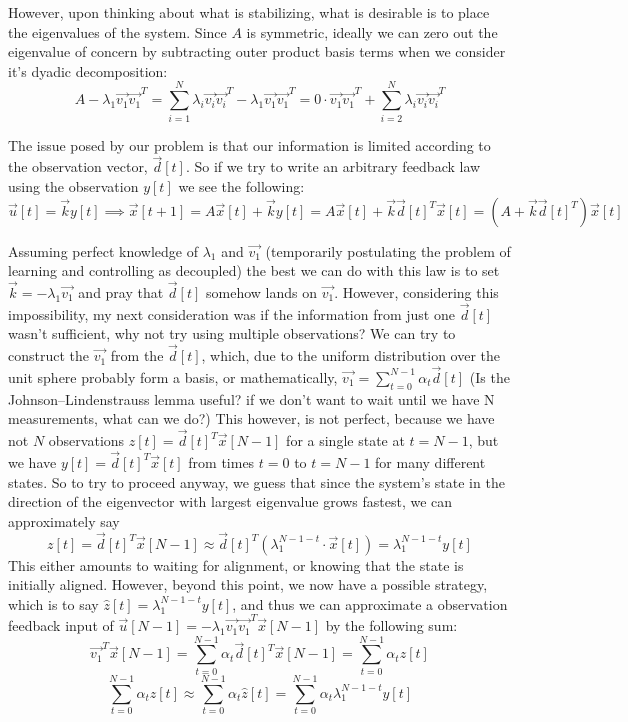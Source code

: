 \documentclass[letterpaper]{article}
\theoremstyle{remark}
\begin{document}
However, upon thinking about what is stabilizing, what is desirable is to place the eigenvalues of the system. Since $A$ is symmetric, ideally we can zero out the eigenvalue of concern by subtracting outer product basis terms when we consider it's dyadic decomposition:
$$A - \lambda_1\vec{v_1}\vec{v_1}^T = \sum_{i=1}^N\lambda_i\vec{v_i}\vec{v_i}^T -\lambda_1\vec{v_1}\vec{v_1}^T = 0\cdot\vec{v_1}\vec{v_1}^T +  \sum_{i=2}^N\lambda_i\vec{v_i}\vec{v_i}^T$$

The issue posed by our problem is that our information is limited according to the observation vector, $\vec{d}[t]$. So if we try to write an arbitrary feedback law using the observation $y[t]$ we see the following:
$$\vec{u}[t] = \vec{k}y[t] \implies \vec{x}[t+1] = A\vec{x}[t] + \vec{k}y[t] = A\vec{x}[t] + \vec{k}\vec{d}[t]^T\vec{x}[t] = \left(A + \vec{k}\vec{d}[t]^T\right)\vec{x}[t]$$

Assuming perfect knowledge of $\lambda_1$ and $\vec{v_1}$ (temporarily postulating the problem of learning and controlling as decoupled) the best we can do with this law is to set $\vec{k} = -\lambda_1\vec{v_1}$ and pray that $\vec{d}[t]$ somehow lands on $\vec{v_1}$. However, considering this impossibility, my next consideration was if the information from just one $\vec{d}[t]$ wasn't sufficient, why not try using multiple observations? We can try to construct the $\vec{v_1}$ from the $\vec{d}[t]$, which, due to the uniform distribution over the unit sphere probably form a basis, or mathematically, $\vec{v_1} = \sum_{t=0}^{N-1}\alpha_t\vec{d}[t]$ (Is the Johnson–Lindenstrauss lemma useful? if we don't want to wait until we have N measurements, what can we do?) This however, is not perfect, because we have not $N$ observations $z[t] =\vec{d}[t]^T\vec{x}[N-1]$ for a single state at $t = N-1$, but we have $y[t] = \vec{d}[t]^T\vec{x}[t]$ from times $t = 0$ to $t = N-1$ for many different states. So to try to proceed anyway, we guess that since the system's state in the direction of the eigenvector with largest eigenvalue grows fastest, we can approximately say
$$z[t] = \vec{d}[t]^T\vec{x}[N-1] \approx \vec{d}[t]^T(\lambda_1^{N-1-t}\cdot\vec{x}[t]) = \lambda_1^{N-1-t}y[t]$$
This either amounts to waiting for alignment, or knowing that the state is initially aligned. However, beyond this point, we now have a possible strategy, which is to say $\hat{z}[t] = \lambda_1^{N-1 - t}y[t]$, and thus we can approximate a observation feedback input of $\vec{u}[N-1] =-\lambda_1\vec{v_1}\vec{v_1}^T\vec{x}[N-1]$ by the following sum:
$$\vec{v_1}^T\vec{x}[N-1] = \sum_{t=0}^{N-1}\alpha_t\vec{d}[t]^T\vec{x}[N-1] = \sum_{t=0}^{N-1}\alpha_tz[t]$$
$$\sum_{t=0}^{N-1}\alpha_tz[t] \approx \sum_{t=0}^{N-1}\alpha_t\hat{z}[t] = \sum_{t=0}^{N-1}\alpha_t\lambda_1^{N-1 - t}y[t]$$
\end{document}
